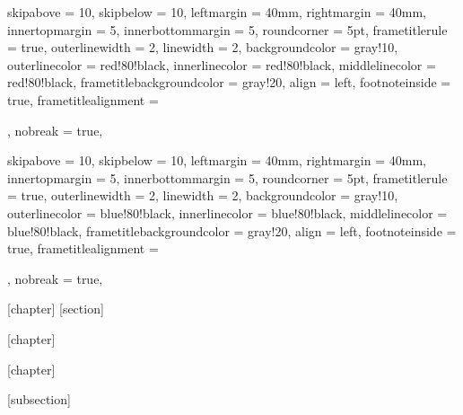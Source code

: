 {
skipabove         = 10,
skipbelow         = 10,
leftmargin        = 40mm,
rightmargin       = 40mm,
innertopmargin    = 5,
innerbottommargin = 5,
%
roundcorner =  5pt,
frametitlerule = true,
%
outerlinewidth  =  2,
linewidth = 2,
%
backgroundcolor = gray!10,
outerlinecolor  = red!80!black,
innerlinecolor  = red!80!black,
middlelinecolor = red!80!black,
frametitlebackgroundcolor = gray!20,
%
align = left,
footnoteinside = true,
frametitlealignment = \raggedright,
nobreak = true,
}


{
skipabove         = 10,
skipbelow         = 10,
leftmargin        = 40mm,
rightmargin       = 40mm,
innertopmargin    = 5,
innerbottommargin = 5,
%
roundcorner =  5pt,
frametitlerule = true,
%
outerlinewidth  =  2,
linewidth = 2,
%
backgroundcolor = gray!10,
outerlinecolor  = blue!80!black,
innerlinecolor  = blue!80!black,
middlelinecolor = blue!80!black,
frametitlebackgroundcolor = gray!20,
%
align = left,
footnoteinside = true,
frametitlealignment = \raggedright,
nobreak = true,
}

[chapter]
[section]





[chapter]

[chapter]

[subsection]







